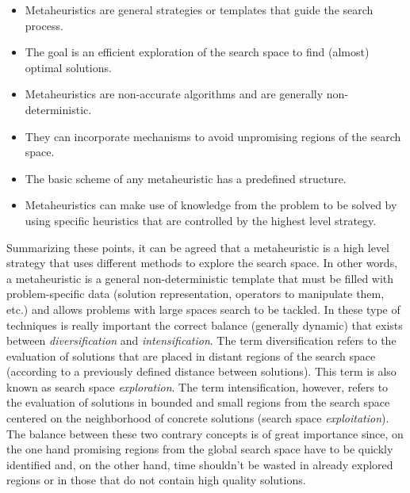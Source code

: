 \begin{itemize}
	\item Metaheuristics are general strategies or templates that guide the search process.
	
	\item The goal is an efficient exploration of the search space to find (almost) optimal solutions.
	
	\item Metaheuristics are non-accurate algorithms and are generally non-deterministic.
	
	\item They can incorporate mechanisms to avoid unpromising regions of the search space.
	
	\item The basic scheme of any metaheuristic has a predefined structure.
	
	\item Metaheuristics can make use of knowledge from the problem to be solved by using specific heuristics that are controlled by the highest level strategy.
\end{itemize}

Summarizing these points, it can be agreed that a metaheuristic is a high level strategy that uses different methods to explore the search space. In other words, a metaheuristic is a general non-deterministic template that must be filled with problem-specific data (solution representation, operators to manipulate them, etc.) and allows problems with large spaces search to be tackled. In these type of techniques is really important the correct balance (generally dynamic) that exists between \emph{diversification} and \emph{intensification}. The term diversification refers to the evaluation of solutions that are placed in distant regions of the search space (according to a previously defined distance between solutions). This term is also known as search space \emph{exploration}. The term intensification, however, refers to the evaluation of solutions in bounded and small regions from the search space centered on the neighborhood of concrete solutions (search space \emph{exploitation}). The balance between these two contrary concepts is of great importance since, on the one hand promising regions from the global search space have to be quickly identified and, on the other hand, time shouldn't be wasted in already explored regions or in those that do not contain high quality solutions.

